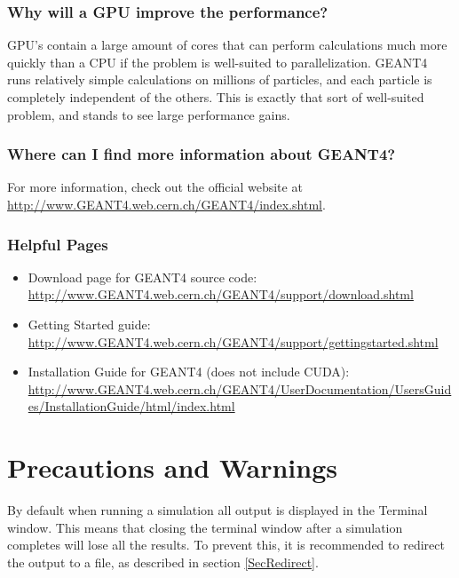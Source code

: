 \documentclass[12pt]{article}
\begin{document}
\subsubsection{Why will a GPU improve the performance?}
GPU's contain a large amount of cores that can perform calculations much more quickly than a CPU if the problem is well-suited to parallelization. GEANT4 runs relatively simple calculations on millions of particles, and each particle is completely independent of the others. This is exactly that sort of well-suited problem, and stands to see large performance gains.

\subsubsection{Where can I find more information about GEANT4?}
For more information, check out the official website at \url{http://www.GEANT4.web.cern.ch/GEANT4/index.shtml}.

\subsubsection{Helpful Pages}
\begin{itemize}
\item Download page for GEANT4 source code: \url{http://www.GEANT4.web.cern.ch/GEANT4/support/download.shtml}
\item Getting Started guide: \url{http://www.GEANT4.web.cern.ch/GEANT4/support/gettingstarted.shtml}
\item Installation Guide for GEANT4 (does not include CUDA): \url{http://www.GEANT4.web.cern.ch/GEANT4/UserDocumentation/UsersGuides/InstallationGuide/html/index.html}
\end{itemize}

\section{Precautions and Warnings}
By default when running a simulation all output is displayed in the Terminal window. This means that closing the terminal window after a simulation completes will lose all the results. To prevent this, it is recommended to redirect the output to a file, as described in section \ref{SecRedirect}.
\end{document}
